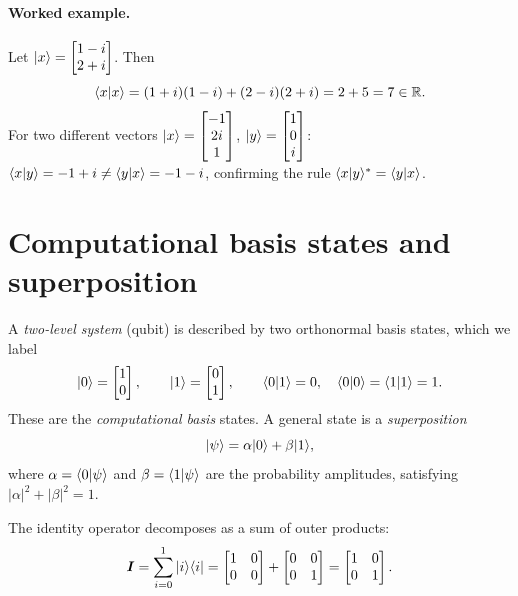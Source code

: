 \paragraph{Worked example.}
Let $\vert x \rangle=\begin{bmatrix}1-i \\ 2+i\end{bmatrix}$.
Then
\[
  \langle x \vert x \rangle
  = (1+i)(1-i)+(2-i)(2+i)=2+5=7\in\mathbb{R}.
\]
For two different vectors
$\vert x \rangle=\begin{bmatrix}-1\\2i\\1\end{bmatrix}$,
$\vert y \rangle=\begin{bmatrix}1\\0\\i\end{bmatrix}$:
$\langle x \vert y \rangle=-1+i\neq\langle y \vert x \rangle=-1-i$,
confirming the rule $\langle x \vert y \rangle^{*}=\langle y \vert x \rangle$.

\section{Computational basis states and superposition}
\label{sec:compbasis}

A \emph{two-level system} (qubit) is described by two orthonormal
basis states, which we label
\[
  \vert 0 \rangle=\begin{bmatrix}1\\0\end{bmatrix},
  \qquad
  \vert 1 \rangle=\begin{bmatrix}0\\1\end{bmatrix},
  \qquad
  \langle 0 \vert 1 \rangle=0,\quad
  \langle 0 \vert 0 \rangle=\langle 1 \vert 1 \rangle=1.
\]
These are the \emph{computational basis} states.  A general state is
a \emph{superposition}
\[
  \vert \psi \rangle = \alpha\vert 0 \rangle+\beta\vert 1 \rangle,
\]
where $\alpha=\langle 0 \vert \psi \rangle$ and $\beta=\langle 1 \vert \psi \rangle$ are
the probability amplitudes, satisfying
$|\alpha|^{2}+|\beta|^{2}=1$.

The identity operator decomposes as a sum of outer products:
\[
  \bm{I}
  = \sum_{i=0}^{1}\vert i \rangle\langle i \vert
  = \begin{bmatrix}1&0\\0&0\end{bmatrix}
   +\begin{bmatrix}0&0\\0&1\end{bmatrix}
  = \begin{bmatrix}1&0\\0&1\end{bmatrix}.
\]

